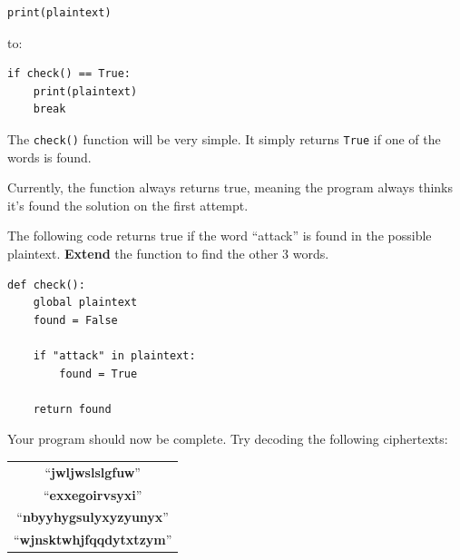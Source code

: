 		\begin{lstlisting}[style=Python, firstnumber=25]
print(plaintext)
		\end{lstlisting}
		
		to:
	
		\begin{lstlisting}[style=Python, firstnumber=25]
if check() == True:
	print(plaintext)
	break
		\end{lstlisting}
		
		The \texttt{check()} function will be very simple. It simply returns \texttt{True} if one of the words is found.
		
		
		
		Currently, the function always returns true, meaning the program always thinks it's found the solution on the first attempt.
		
		The following code returns true if the word ``attack'' is found in the possible plaintext. \textbf{Extend} the function to find the other 3 words.
		
		\begin{lstlisting}[style=Python, firstnumber=35]
def check():
	global plaintext
	found = False

	if "attack" in plaintext:
		found = True
		
	return found
		\end{lstlisting}
		
		Your program should now be complete. Try decoding the following ciphertexts:
		
		\begin{tabular}{c}
			``\textbf{jwljwslslgfuw}'' \\ 
			``\textbf{exxegoirvsyxi}''\\ 
			``\textbf{nbyyhygsulyxyzyunyx}''\\ 
			``\textbf{wjnsktwhjfqqdytxtzym}''\\
		\end{tabular} 
		